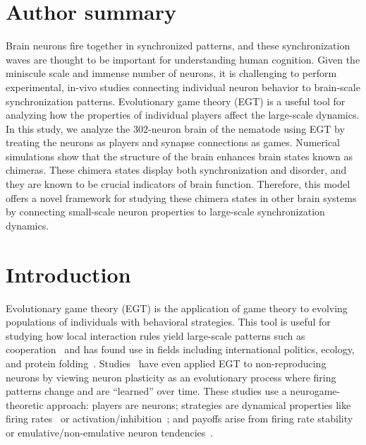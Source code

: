 \documentclass[10pt,letterpaper]{article}
\begin{document}
\section*{Author summary}
Brain neurons fire together in synchronized patterns,
and these synchronization waves are thought to be important
for understanding human cognition.
Given the miniscule scale and immense number of neurons,
it is challenging to perform experimental, in-vivo studies
connecting individual neuron behavior
to brain-scale synchronization patterns.
Evolutionary game theory (EGT) is a useful tool for analyzing
how the properties of individual players affect the large-scale dynamics.
In this study, we analyze the 302-neuron brain
of the  nematode using EGT
by treating the neurons as players and synapse connections as games.
Numerical simulations show that the structure of the  brain
enhances brain states known as chimeras.
These chimera states display both synchronization and disorder,
and they are known to be crucial indicators
of brain function.
Therefore, this model offers a novel framework for studying
these chimera states in other brain systems by connecting
small-scale neuron properties to large-scale synchronization dynamics.

\linenumbers
\glsresetall

\section{Introduction}
Evolutionary game theory (EGT) is the application
of game theory to evolving populations
of individuals with behavioral strategies.
This tool is useful for studying how local interaction rules
yield large-scale patterns such as cooperation~\cite{sigmund1999evolutionary}
and has found use in fields including international politics, ecology,
and protein folding~\cite{traulsen2023future}.
Studies~\cite{cohen2009evolutionary,madeo2017evolutionary,tripp2022evolutionary,poggio2025computational}
have even applied EGT to non-reproducing neurons
by viewing neuron plasticity as an evolutionary process
where firing patterns change and are ``learned'' over time.
These studies use a neurogame-theoretic approach:
players are neurons;
strategies are dynamical properties like
firing rates~\cite{cohen2009evolutionary} or
activation/inhibition~\cite{madeo2017evolutionary};
and payoffs
arise from
firing rate stability~\cite{cohen2009evolutionary}
or
emulative/non-emulative neuron
tendencies~\cite{madeo2017evolutionary}.
\end{document}
